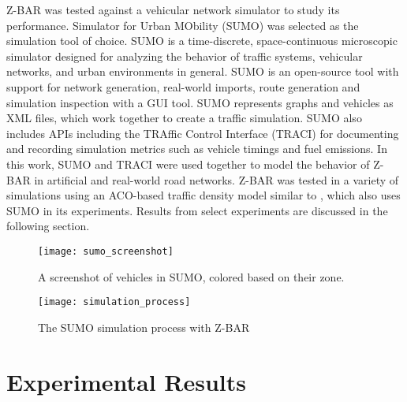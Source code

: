 \documentclass[conference]{IEEEtran}
\begin{document}
Z-BAR was tested against a vehicular network simulator to study its performance. Simulator for Urban MObility (SUMO) \cite{sumo} was selected as the simulation tool of choice. SUMO is a time-discrete, space-continuous microscopic simulator designed for analyzing the behavior of traffic systems, vehicular networks, and urban environments in general. SUMO is an open-source tool with support for network generation, real-world imports, route generation and simulation inspection with a GUI tool. SUMO represents graphs and vehicles as XML files, which work together to create a traffic simulation. SUMO also includes APIs including the TRAffic Control Interface (TRACI) \cite{traci} for documenting and recording simulation metrics such as vehicle timings and fuel emissions. In this work, SUMO and TRACI were used together to model the behavior of Z-BAR in artificial and real-world road networks. Z-BAR was tested in a variety of simulations using an ACO-based traffic density model similar to \cite{iaco}, which also uses SUMO in its experiments. Results from select experiments are discussed in the following section.

\begin{figure}[h]
\caption{A screenshot of vehicles in SUMO, colored based on their zone.}
\centering
\texttt{[image: sumo\_screenshot]}
\end{figure}

\begin{figure}[h]
\caption{The SUMO simulation process with Z-BAR}
\centering
\texttt{[image: simulation\_process]}
\end{figure}


\section{Experimental Results} %
\end{document}
